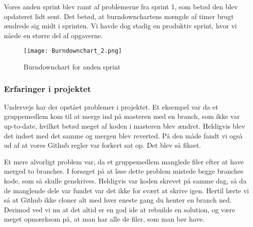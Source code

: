 Vores anden sprint blev ramt af problemerne fra sprint 1, som betød den blev opdateret lidt sent.
Det betød, at burndownchartens mængde af timer brugt ændrede sig midt i sprinten.
Vi havde dog stadig en produktiv sprint, hvor vi nåede en større del af opgaverne.

\begin{figure}[h]
    \caption{Burndownchart for anden sprint}
    \centering
        \texttt{[image: Burndownchart\_2.png]}
    \label{burndownsecondsprint}
\end{figure}

\subsubsection{Erfaringer i projektet}

Undervejs har der opstået problemer i projektet.
Et eksempel var da et gruppemedlem kom til at merge ind på masteren med en branch, som ikke var up-to-date, hvilket betød meget af koden i masteren blev ændret.
Heldigvis blev det indset med det samme og mergen blev reverted.
På den måde fandt vi også ud af at vores Github regler var forkert sat op.
Det blev så fikset.

Et mere alvorligt problem var, da et gruppemedlem manglede filer efter at have merged to branches.
I forsøget på at løse dette problem mistede begge branches kode, som så skulle genskrives.
Heldigvis var koden skrevet på samme dag, så da de manglende dele var fundet var det ikke for svært at skrive igen.
Hertil lærte vi så at Github ikke cloner alt med hver eneste gang du henter en branch ned.
Derimod ved vi nu at det altid er en god ide at rebuilde en solution, og være meget opmærksom på, at man har alle de filer, som man bør have.